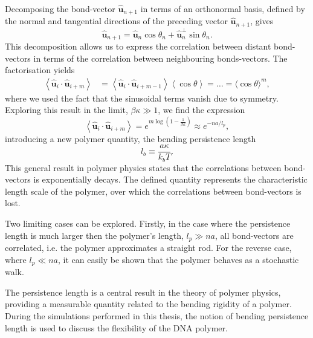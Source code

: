 Decomposing the bond-vector $\boldsymbol{\hat{u}}_{n+1}$ in terms of an orthonormal
basis, defined by the normal and tangential directions of the preceding vector
$\boldsymbol{\hat{u}}_{n+1}$, gives
\begin{equation}
\boldsymbol{\hat{u}}_{n+1} = \boldsymbol{\hat{u}}_{n} \cos \theta_{n} +
\boldsymbol{\hat{u}}_{n}^{\perp} \sin \theta_{n}.
\end{equation}
This decomposition allows us to express the correlation between distant bond-vectors in
terms of the correlation between neighbouring bonds-vectors. The factorisation
yields
\begin{equation}
\begin{aligned}
    \left\langle\boldsymbol{\hat{u}}_{i} \cdot \boldsymbol{\hat{u}}_{i+m}\right\rangle
    &=\left\langle\boldsymbol{\hat{u}}_{i} \cdot
        \boldsymbol{\hat{u}}_{i+m-1}\right\rangle\left\langle\cos
    \theta\right\rangle = \dots =\langle\cos \theta\rangle^{m},
\end{aligned}
\end{equation}
where we used the fact that the sinusoidal terms vanish due to symmetry.
Exploring this result in the limit, $\beta \kappa \gg 1$, we find the expression
\begin{equation}
    \left\langle\boldsymbol{\hat{u}}_{i} \cdot \boldsymbol{\hat{u}}_{i+m}\right\rangle =
    e^{m \log(1 - \frac{1}{\beta \kappa})} \approx e^{-na/l_p},
\end{equation}
introducing a new polymer quantity, the bending persistence length
\begin{equation}
    l_b \equiv \frac{a \kappa}{k_{b} T}.
\end{equation}
This general result in polymer physics states that the correlations between bond-vectors
is exponentially decays. The defined quantity represents the characteristic
length scale of the polymer, over which the correlations between
bond-vectors is lost.

Two limiting cases can be explored. Firstly, in the
case where the persistence length is much larger then the polymer's length, $l_p \gg na$,
all bond-vectors are correlated, i.e. the polymer approximates a straight rod. For the
reverse case, where $l_p \ll na$, it can easily be shown that the polymer behaves as a
stochastic walk.

The persistence length is a central result in the theory of polymer physics, providing a
measurable quantity related to the bending rigidity of a polymer. During the
simulations performed in this thesis, the notion of bending persistence length is used to
discuss the flexibility of the DNA polymer.

